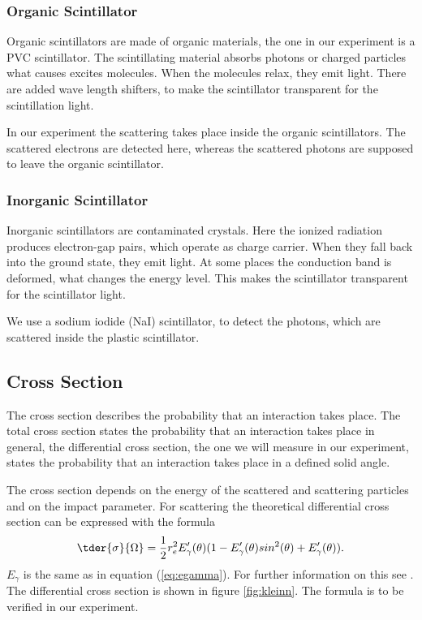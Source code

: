 \subsubsection{Organic Scintillator}
Organic scintillators are made of organic materials, the one in our
experiment is a PVC scintillator. The scintillating material absorbs photons or
charged particles what causes excites molecules. When the molecules relax,
they emit light. There are added wave length shifters, to make the
scintillator transparent for the scintillation light. 

In our experiment the \compton scattering takes place inside the organic
scintillators. The scattered electrons are detected here, whereas the
scattered photons are supposed to leave the organic scintillator.

\subsubsection{Inorganic Scintillator}
Inorganic scintillators are contaminated crystals. Here the ionized
radiation produces electron-gap pairs, which operate as charge carrier. When
they fall back into the ground state, they emit light. At some places the
conduction band is deformed, what changes the energy level. This makes the
scintillator transparent for the scintillator light.

We use a sodium iodide (NaI) scintillator, to detect the photons, which
are scattered inside the plastic scintillator.

\newcommand{\kleinn}{\person{Klein-Nishina}}

\subsection{Cross Section}
The cross section describes the probability that an interaction takes place.
The total cross section states the probability that an
interaction takes place in general, the differential cross section, the one
we will measure in our experiment, states the probability that an
interaction takes place in a defined solid angle.

The cross section depends on the energy of the scattered and scattering
particles and on the impact parameter.  For \compton scattering the
theoretical differential cross section can be expressed with the \kleinn  formula
\begin{align}
 \tder{\sigma}{\Omega} = \frac{1}{2} r^2_e E'_{\gamma} (\theta) (1 -
 E'_{\gamma} (\theta) sin^2 (\theta) + E'_{\gamma} (\theta) ).
 \label{eq:kleinn}
\end{align}
$E_{\gamma}$ is the same as in equation (\ref{eq:egamma}). For further
information on this see \cite{otto}. The
differential cross section is shown in figure \ref{fig:kleinn}. The 
\kleinn  formula is to be verified in our experiment. 

